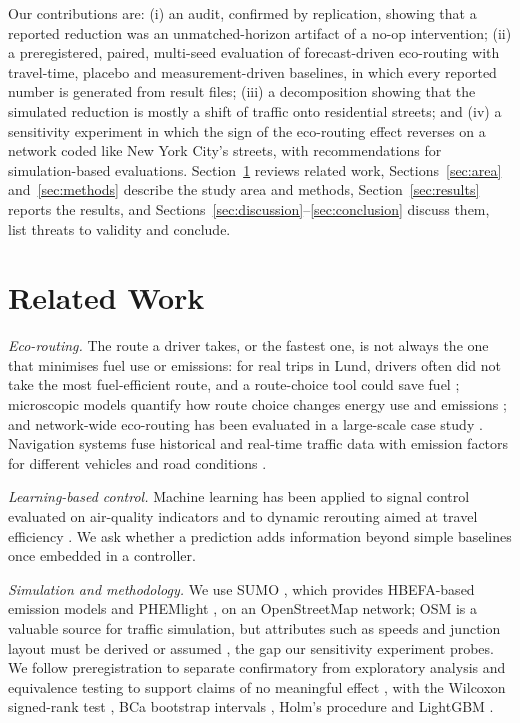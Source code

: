 \documentclass[conference]{IEEEtran}
\begin{document}
Our contributions are: (i) an audit, confirmed by replication, showing that a reported reduction was an
unmatched-horizon artifact of a no-op intervention; (ii) a preregistered, paired, multi-seed evaluation of
forecast-driven eco-routing with travel-time, placebo and measurement-driven baselines, in which every reported
number is generated from result files; (iii) a decomposition showing that the simulated reduction is mostly a shift of
traffic onto residential streets; and (iv) a sensitivity experiment in which the sign of the eco-routing effect
reverses on a network coded like New York City's streets, with recommendations for simulation-based evaluations.
Section~\ref{sec:related} reviews related work, Sections~\ref{sec:area} and~\ref{sec:methods} describe the study
area and methods, Section~\ref{sec:results} reports the results, and Sections~\ref{sec:discussion}--\ref{sec:conclusion}
discuss them, list threats to validity and conclude.

\section{Related Work}\label{sec:related}
\textit{Eco-routing.} The route a driver takes, or the fastest one, is not always the one that minimises fuel use or
emissions: for real trips in Lund, drivers often did not take the most fuel-efficient route, and a route-choice tool
could save fuel \cite{ericsson2006fuel}; microscopic models quantify how route choice changes energy use and emissions
\cite{ahn2008route}; and network-wide eco-routing has been evaluated in a large-scale case study
\cite{ahn2013ecorouting}. Navigation systems fuse historical and real-time traffic data with emission factors for
different vehicles and road conditions \cite{boriboonsomsin2012ecorouting}.

\textit{Learning-based control.} Machine learning has been applied to signal control evaluated on air-quality
indicators \cite{fazzini2022signals,haydari2021signals} and to dynamic rerouting aimed at travel efficiency
\cite{du2021rerouting}. We ask whether a prediction adds information beyond simple baselines once embedded in a
controller.

\textit{Simulation and methodology.} We use SUMO \cite{lopez2018sumo}, which provides HBEFA-based emission models and
PHEMlight \cite{krajzewicz2015emissions}, on an OpenStreetMap network; OSM is a valuable source for traffic
simulation, but attributes such as speeds and junction layout must be derived or assumed \cite{zilske2011osm}, the
gap our sensitivity experiment probes. We follow preregistration to separate confirmatory from exploratory analysis
\cite{nosek2018prereg} and equivalence testing to support claims of no meaningful effect
\cite{schuirmann1987tost,lakens2017equivalence}, with the Wilcoxon signed-rank test \cite{wilcoxon1945}, BCa bootstrap
intervals \cite{efron1987bca}, Holm's procedure \cite{holm1979} and LightGBM \cite{ke2017lightgbm}.
\end{document}
